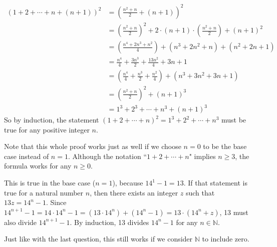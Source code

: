 \documentclass[12pt]{article}
\begin{document}
\begin{align*}
    (1 + 2 + \cdots + n + (n + 1))^2 &= \left( \frac{n^2 + n}{2} + (n + 1) \right)^2 \\
                                     &= \left( \frac{n^2 + n}{2} \right)^2 + 2 \cdot (n + 1) \cdot \left( \frac{n^2 + n}{2} \right) + (n + 1)^2 \\
                                     &= \left( \frac{n^4 + 2n^3 + n^2}{4} \right) + (n^3 + 2n^2 + n) + (n^2 + 2n + 1) \\
                                     &= \frac{n^4}{4} + \frac{3n^3}{2} + \frac{13n^2}{4} + 3n + 1 \\
                                     &= \left( \frac{n^4}{4} + \frac{n^3}{2} + \frac{n^2}{4} \right) + (n^3 + 3n^2 + 3n + 1) \\
                                     &= \left( \frac{n^2 + n}{2} \right)^2 + (n + 1)^3 \\
                                     &= 1^3 + 2^3 + \cdots + n^3 + (n + 1)^3
\end{align*}
So by induction, the statement $(1 + 2 + \cdots + n)^2 = 1^3 + 2^2 + \cdots + n^3$ must be true for any positive integer $n$.
\par
Note that this whole proof works just as well if we choose $n=0$ to be the base case instead of $n=1$. Although the notation ``$1 + 2 + \cdots + n$" implies $n \geq 3$, the formula works for any $n \geq 0$.
\bigskip

\noindent{}\bigskip

This is true in the base case ($n=1$), because $14^1 - 1 = 13$. If that statement is true for a natural number $n$, then there exists an integer $z$ such that $13z = 14^n - 1$. Since $14^{n+1} - 1 = 14 \cdot 14^n - 1 = (13 \cdot 14^n) + (14^n - 1) = 13 \cdot (14^n + z)$, 13 must also divide $14^{n+1} - 1$. By induction, 13 divides $14^n - 1$ for any $n \in \mathbb{N}$.
\par
Just like with the last question, this still works if we consider $\mathbb{N}$ to include zero.

\bigskip
\noindent{}\bigskip
\end{document}

